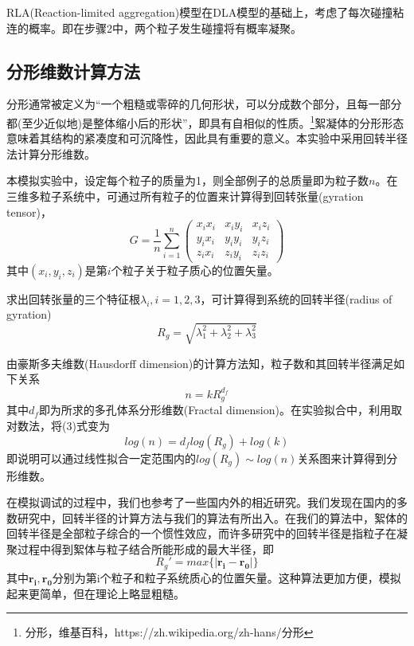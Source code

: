 \documentclass[lang=cn,11pt,a4paper,cite=authoryear]{elegantpaper}
\begin{document}
RLA(Reaction-limited aggregation)模型在DLA模型的基础上，考虑了每次碰撞粘连的概率。即在步骤2中，两个粒子发生碰撞将有概率凝聚。

\subsection{分形维数计算方法}
分形通常被定义为“一个粗糙或零碎的几何形状，可以分成数个部分，且每一部分都(至少近似地)是整体缩小后的形状”，即具有自相似的性质。\footnote{分形，维基百科，https://zh.wikipedia.org/zh-hans/分形}絮凝体的分形形态意味着其结构的紧凑度和可沉降性，因此具有重要的意义。本实验中采用回转半径法计算分形维数。

本模拟实验中，设定每个粒子的质量为1，则全部例子的总质量即为粒子数$n$。在三维多粒子系统中，可通过所有粒子的位置来计算得到回转张量(gyration tensor)，
\begin{equation}
    G = \frac{1}{n}\sum\limits_{i = 1}^n
    \left(
        \begin{matrix}
            x_ix_i & x_iy_i & x_iz_i\\
            y_ix_i & y_iy_i & y_iz_i\\
            z_ix_i & z_iy_i & z_iz_i
        \end{matrix}
    \right)
\end{equation}
其中\((x_i, y_i, z_i)\)是第$i$个粒子关于粒子质心的位置矢量。

求出回转张量的三个特征根$\lambda_i, i = 1, 2, 3$，可计算得到系统的回转半径(radius of gyration)
\begin{equation}
    R_g = \sqrt{\lambda_1^2 + \lambda_2^2 + \lambda_3^2}
\end{equation}

由豪斯多夫维数(Hausdorff dimension)的计算方法知，粒子数和其回转半径满足如下关系
\begin{equation}
    n = kR_g^{d_f}
\end{equation}
其中$d_f$即为所求的多孔体系分形维数(Fractal dimension)。在实验拟合中，利用取对数法，将(3)式变为
\begin{equation}
    log(n) = d_flog(R_g) + log(k)
\end{equation}
即说明可以通过线性拟合一定范围内的$log(R_g)\sim log(n)$关系图来计算得到分形维数。

在模拟调试的过程中，我们也参考了一些国内外的相近研究。我们发现在国内的多数研究中，回转半径的计算方法与我们的算法有所出入。在我们的算法中，絮体的回转半径是全部粒子综合的一个惯性效应，而许多研究中的回转半径是指粒子在凝聚过程中得到絮体与粒子结合所能形成的最大半径，即
\begin{equation}
    R_g' = max\{ |\mathbf{r_i} - \mathbf{r_0}|\}
\end{equation}
其中$\mathbf{r_i}, \mathbf{r_0}$分别为第i个粒子和粒子系统质心的位置矢量。这种算法更加方便，模拟起来更简单，但在理论上略显粗糙。
\end{document}
